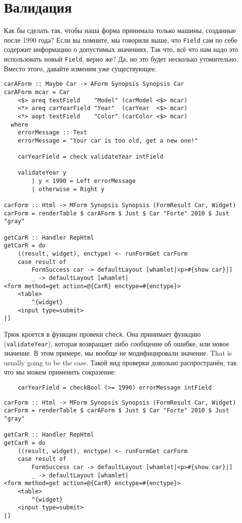 \section{Валидация}
Как бы сделать так, чтобы наша форма принимала только машины, созданные после 1990 года?
Если вы помните, мы говорили выше, что \lstinline'Field' сам по себе содержит информацию 
о допустимых значениях. Так что, всё что нам надо это использовать новый
\lstinline'Field', верно же? Да, но это будет несколько утомительно. Вместо этого,
давайте изменим уже существующее.
\begin{lstlisting}
carAForm :: Maybe Car -> AForm Synopsis Synopsis Car
carAForm mcar = Car
    <$> areq textField    "Model" (carModel <$> mcar)
    <*> areq carYearField "Year"  (carYear  <$> mcar)
    <*> aopt textField    "Color" (carColor <$> mcar)
  where
    errorMessage :: Text
    errorMessage = "Your car is too old, get a new one!"

    carYearField = check validateYear intField

    validateYear y
        | y < 1990 = Left errorMessage
        | otherwise = Right y

carForm :: Html -> MForm Synopsis Synopsis (FormResult Car, Widget)
carForm = renderTable $ carAForm $ Just $ Car "Forte" 2010 $ Just "gray"

getCarR :: Handler RepHtml
getCarR = do
    ((result, widget), enctype) <- runFormGet carForm
    case result of
        FormSuccess car -> defaultLayout [whamlet|<p>#{show car}|]
        _ -> defaultLayout [whamlet|
<form method=get action=@{CarR} enctype=#{enctype}>
    <table>
        ^{widget}
    <input type=submit>
|]
\end{lstlisting}

Трюк кроется в функции провеки \lstinline'check'. Она принимает функцию 
(\lstinline'validateYear'), которая возвращает либо сообщение об ошибке, или новое
значение. В этом примере, мы вообще не модифицировали значение. That is usually going to
be the case. Такой вид проверки довольно распространён, так что мы можем применить
сокразение:

\begin{lstlisting}
    carYearField = checkBool (>= 1990) errorMessage intField
\end{lstlisting}

\begin{lstlisting}
carForm :: Html -> MForm Synopsis Synopsis (FormResult Car, Widget)
carForm = renderTable $ carAForm $ Just $ Car "Forte" 2010 $ Just "gray"

getCarR :: Handler RepHtml
getCarR = do
    ((result, widget), enctype) <- runFormGet carForm
    case result of
        FormSuccess car -> defaultLayout [whamlet|<p>#{show car}|]
        _ -> defaultLayout [whamlet|
<form method=get action=@{CarR} enctype=#{enctype}>
    <table>
        ^{widget}
    <input type=submit>
|]
\end{lstlisting}

